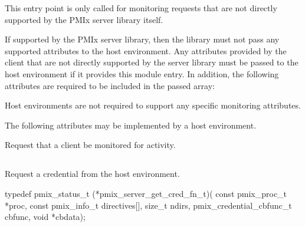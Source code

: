 This entry point is only called for monitoring requests that are not directly supported by the \ac{PMIx} server library itself.

\reqattrstart
If supported by the \ac{PMIx} server library, then the library must not pass any supported attributes to the host environment. Any attributes provided by the client that are not directly supported by the server library must be passed to the host environment if it provides this module entry. In addition, the following attributes are required to be included in the passed  array:


Host environments are not required to support any specific monitoring attributes.

\reqattrend

\optattrstart
The following attributes may be implemented by a host environment.


\optattrend

\descr

Request that a client be monitored for activity.

\subsection{}

\summary

Request a credential from the host environment.

\format

\cspecificstart
\begin{codepar}
typedef pmix_status_t (*pmix_server_get_cred_fn_t)(
                             const pmix_proc_t *proc,
                             const pmix_info_t directives[],
                             size_t ndirs,
                             pmix_credential_cbfunc_t cbfunc,
                             void *cbdata);
\end{codepar}
\cspecificend

